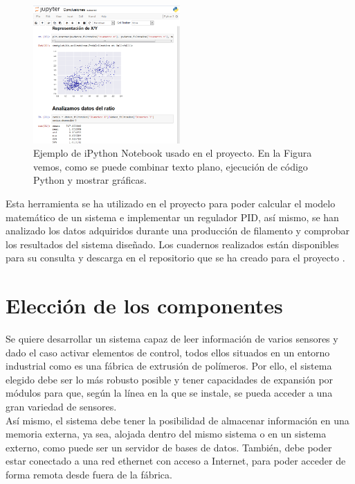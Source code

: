 \begin{figure}[hd!]
    \centering
    \includegraphics[width=0.5\textwidth]{images/ipython.png}
    \caption[Ejemplo de iPython Notebook usado en el proyecto.]{Ejemplo de iPython Notebook usado en el proyecto. En la Figura vemos, como se puede combinar texto plano, ejecución de código Python y mostrar gráficas.}
    \label{fig:ipython}
\end{figure}

Esta herramienta se ha utilizado en el proyecto para poder calcular el modelo matemático de un sistema e implementar un regulador PID, así mismo, se han analizado los datos adquiridos durante una producción de filamento y comprobar los resultados del sistema diseñado. Los cuadernos realizados están disponibles para su consulta y descarga en el repositorio que se ha creado para el proyecto \cite{githubTFG}.


\section{Elección de los componentes}

Se quiere desarrollar un sistema capaz de leer información de varios sensores y dado el caso activar elementos de control, todos ellos situados en un entorno industrial como es una fábrica de extrusión de polímeros. Por ello, el sistema elegido debe ser lo más robusto posible y tener capacidades de expansión por módulos para que, según la línea en la que se instale, se pueda acceder a una gran variedad de sensores.\\ 

Así mismo, el sistema debe tener la posibilidad de almacenar información en una memoria externa, ya sea, alojada dentro del mismo sistema o en un sistema externo, como puede ser un servidor de bases de datos. También, debe poder estar conectado a una red ethernet con acceso a Internet, para poder acceder de forma remota desde fuera de la fábrica.\\ 

